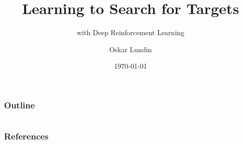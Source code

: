 \documentclass[handout,aspectratio=169]{beamer}
\title{Learning to Search for Targets}
\subtitle{with Deep Reinforcement Learning}
\author{Oskar Lundin}
\institute{Linköping University}
\date{\today}
\begin{document}
\begin{frame}
    \titlepage
\end{frame}

\begin{frame}
    \frametitle{Outline}
    \tableofcontents
\end{frame}







\section{}
\subsection{}
\begin{frame}
    \frametitle{References}
    
    
\end{frame}

\appendix


\end{document}
